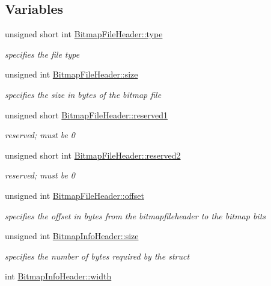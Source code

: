 \subsection*{Variables}
\begin{DoxyCompactItemize}
\item 
unsigned short int \mbox{\hyperlink{group__bitmap_ga0206e64e29930b0594e714cbdf8090f0}{Bitmap\+File\+Header\+::type}}
\begin{DoxyCompactList}\small\item\em specifies the file type \end{DoxyCompactList}\item 
unsigned int \mbox{\hyperlink{group__bitmap_ga0dcad71d9b17783c4d296c2c6d00ede0}{Bitmap\+File\+Header\+::size}}
\begin{DoxyCompactList}\small\item\em specifies the size in bytes of the bitmap file \end{DoxyCompactList}\item 
unsigned short \mbox{\hyperlink{group__bitmap_ga16d8cfe2edb9d109cea44ab94d1b701a}{Bitmap\+File\+Header\+::reserved1}}
\begin{DoxyCompactList}\small\item\em reserved; must be 0 \end{DoxyCompactList}\item 
unsigned short int \mbox{\hyperlink{group__bitmap_ga24130729dee5b8b9c1bd45f0a73c9a9d}{Bitmap\+File\+Header\+::reserved2}}
\begin{DoxyCompactList}\small\item\em reserved; must be 0 \end{DoxyCompactList}\item 
unsigned int \mbox{\hyperlink{group__bitmap_ga26ed598693b100ffd9e29c4dc77f3d92}{Bitmap\+File\+Header\+::offset}}
\begin{DoxyCompactList}\small\item\em specifies the offset in bytes from the bitmapfileheader to the bitmap bits \end{DoxyCompactList}\item 
unsigned int \mbox{\hyperlink{group__bitmap_ga411fa70f6547a0360b33edcd3273d169}{Bitmap\+Info\+Header\+::size}}
\begin{DoxyCompactList}\small\item\em specifies the number of bytes required by the struct \end{DoxyCompactList}\item 
int \mbox{\hyperlink{group__bitmap_gac2034cfbada460819beed1ee24581c5d}{Bitmap\+Info\+Header\+::width}}

\end{DoxyCompactItemize}
